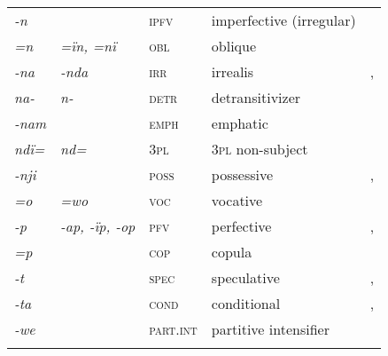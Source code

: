 \begin{table}
\begin{tabularx}{\textwidth}{lllQl}
{\itshape {}-n} &  & {\scshape ipfv} & imperfective (irregular) & \\
{\itshape =n} & {\itshape =ïn, =nï} & {\scshape obl} & oblique & \\
{\itshape {}-na} & {\itshape {}-nda} & {\scshape irr} & irrealis & , \\
{\itshape na-} & {\itshape n-} & {\scshape detr} & detransitivizer & \\
{\itshape {}-nam} &  & {\scshape emph} & emphatic & \\
{\itshape ndï=} & {\itshape nd=} & {\scshape 3pl} & 3\textsc{pl} non-subject & \\
{\itshape {}-nji} &  & {\scshape poss} & possessive & , \\
{\itshape {}=o} & {\itshape {}=wo} & {\scshape voc} & vocative & \\
{\itshape {}-p} & {\itshape {}-ap, {}-ïp, {}-op} & {\scshape pfv} & perfective & , \\
{\itshape =p} &  & {\scshape cop} & copula & \\
{\itshape {}-t} &  & {\scshape spec} & speculative & , \\
{\itshape {}-ta} &  & {\scshape cond} & conditional & , \\
{\itshape {}-we} &  & {\scshape part.int} & partitive intensifier & \\
\lspbottomrule
\end{tabularx}
\end{table}